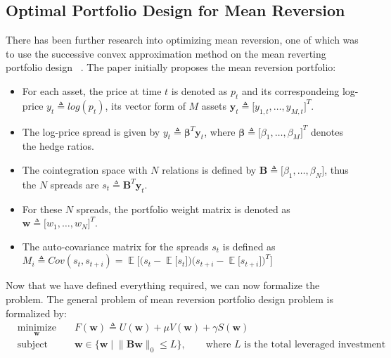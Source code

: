 \subsection{Optimal Portfolio Design for Mean Reversion}
There has been further research into optimizing mean reversion, one of which was to use the successive convex approximation method on the mean reverting portfolio design ~\cite{ZipingZhao2019OMPW}. The paper initially proposes the mean reversion portfolio:
\begin{itemize}
    \itemsep0em
    \item For each asset, the price at time $t$ is denoted as $p_t$ and its correspondeing log-price $y_t \triangleq log(p_t)$, its vector form of $M$ assets $\mathbf{y}_t \triangleq \big[ y_{1,t}, \dots ,y_{M,t} \big]^T$.
    \item The log-price spread is given by $y_t \triangleq \mathbf{\beta}^T\mathbf{y}_t$, where $\mathbf{\beta} \triangleq \big[ \beta_1, \dots ,\beta_M \big]^T$ denotes the hedge ratios.
    \item The cointegration space with $N$ relations is defined by $\mathbf{B} \triangleq \big[ \beta_1, \dots ,\beta_N \big]$, thus the $N$ spreads are $s_t \triangleq \mathbf{B}^T\mathbf{y}_t$.
    \item For these $N$ spreads, the portfolio weight matrix is denoted as $\mathbf{w} \triangleq \big[ w_1, \dots ,w_N \big]^T$.
    \item The auto-covariance matrix for the spreads $s_t$ is defined as \\ ${M_i \triangleq Cov(s_t, s_{t+i}) = \mathop{\mathbb{E}} \big[ \big( s_t - \mathop{\mathbb{E}} \big[ s_t \big]\big) \big( s_{t+i} - \mathop{\mathbb{E}} \big[ s_{t+i} \big]\big)^T \big]}$
\end{itemize}

\noindent Now that we have defined everything required, we can now formalize the problem. The general problem of mean reversion portfolio design problem is formalized by:
\begin{equation*}
    \begin{aligned}
         & \underset{\mathbf{w}}{\text{minimize}}
         &                                        & F(\mathbf{w}) \triangleq U(\mathbf{w}) + \mu V(\mathbf{w}) + \gamma S(\mathbf{w})                                                                       \\
         & \text{subject to}
         &                                        & \mathbf{w} \in \biggl\{ \mathbf{w} \mid \big\| \mathbf{B} \mathbf{w}\big\|_0 \leq L \biggr\}, \qquad \text{where $L$ is the total leveraged investment}
    \end{aligned}
\end{equation*}

